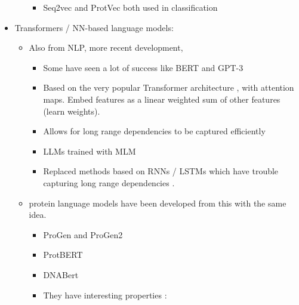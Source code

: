 \documentclass[
  11pt,
  twoside,
  BCOR=10mm,
  listof=totoc]{scrbook}
\providecommand{\tightlist}{%
  \setlength{\itemsep}{0pt}\setlength{\parskip}{0pt}}
\begin{document}
\begin{itemize}
\begin{itemize}
    \begin{itemize}
    \tightlist
    \item
      Seq2vec and ProtVec both used in classification \autocite{kimothiMetricLearningBiological2017}
    \end{itemize}
  \end{itemize}
\item
  Transformers / NN-based language models:

  \begin{itemize}
  \item
    Also from NLP, more recent development,

    \begin{itemize}
    \tightlist
    \item
      Some have seen a lot of success like BERT \autocite{devlinBERTPretrainingDeep2019} and GPT-3 \autocite{brownLanguageModelsAre2020}
    \item
      Based on the very popular Transformer architecture \autocite{vaswaniAttentionAllYou2017}, with attention maps. Embed features as a linear weighted sum of other features (learn weights).
    \item
      Allows for long range dependencies to be captured efficiently
    \item
      LLMs trained with MLM
    \item
      Replaced methods based on RNNs / LSTMs which have trouble capturing long range dependencies \autocite{songPretrainingModelBiological2021}.
    \end{itemize}
  \item
    protein language models have been developed from this with the same idea.

    \begin{itemize}
    \item
      ProGen \autocite{madaniProGenLanguageModeling2020} and ProGen2 \autocite{eriknijkampProGen2ExploringBoundaries2022}
    \item
      ProtBERT \autocite{elnaggarProtTransCrackingLanguage2021}
    \item
      DNABert \autocite{jiDNABERTPretrainedBidirectional2021}
    \item
      They have interesting properties \autocite{beplerLearningProteinLanguage2021}:


\end{itemize}
\end{itemize}
\end{itemize}
\end{document}

